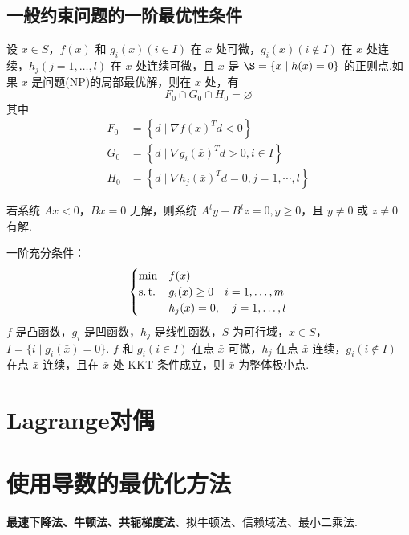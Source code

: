 \subsection{一般约束问题的一阶最优性条件}
\begin{theorem}
    设 $\bar{x} \in S$，$f(x)$ 和 $g_i(x)(i\in I)$ 在 $\bar{x}$ 处可微，$g_i(x) (i \notin I)$ 在 $\bar{x}$ 处连续，$h_j(j = 1, \dots, l)$ 在 $\bar{x}$ 处连续可微，且 $\bar{x}$ 是 $\S = \{x \mid h(x) = 0\}$ 的正则点.如果 $\bar{x}$ 是问题(NP)的局部最优解，则在 $\bar{x}$ 处，有\[F_{0} \cap G_{0} \cap H_{0}=\varnothing\]其中
    \begin{align*}
        F_{0}&=\left\{d \mid \nabla f(\bar{x})^{T} d<0\right\} \\
        G_{0}&=\left\{d \mid \nabla g_{i}(\bar{x})^{T} d>0, i \in I\right\} \\
        H_{0}&=\left\{d \mid \nabla h_{j}(\bar{x})^{T} d=0, j=1, \cdots, l\right\}
    \end{align*}
\end{theorem}

\begin{theorem}
    若系统 $Ax < 0$，$Bx = 0$ 无解，则系统 $A^ty + B^tz = 0, y \ge 0$，且 $y \neq 0$ 或 $z \neq 0$ 有解.
\end{theorem}

\begin{remark}
    一阶充分条件：\[\begin{cases}
        \min &f(x)\\
        \operatorname{s.t.} &g_i(x) \ge 0 \quad i = 1, \dots, m\\
        &h_j(x) = 0, \quad j = 1, \dots, l
    \end{cases}\]
    $f$ 是凸函数，$g_i$ 是凹函数，$h_j$ 是线性函数，$S$ 为可行域，$\bar{x} \in S$，$I = \{i \mid g_i(\bar{x}) = 0\}$. $f$ 和 $g_i(i \in I)$ 在点 $\bar{x}$ 可微，$h_j$ 在点 $\bar{x}$ 连续，$g_i(i \notin I)$ 在点 $\bar{x}$ 连续，且在 $\bar{x}$ 处 KKT 条件成立，则 $\bar{x}$ 为整体极小点.
\end{remark}

\section{Lagrange对偶}

\section{使用导数的最优化方法}
\textbf{最速下降法、牛顿法、共轭梯度法}、拟牛顿法、信赖域法、最小二乘法.

